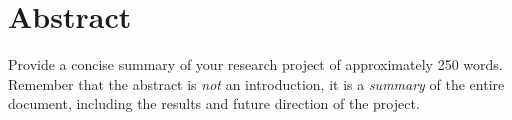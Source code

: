 \chapter*{Abstract} 
Provide a concise summary of your  research project of approximately 250 words. 
Remember that the abstract is {\it not\/} an introduction, it is a {\it summary\/} of the entire document, including the results and future direction of the project.